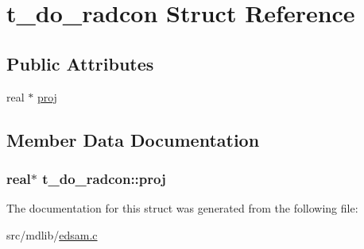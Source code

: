 \hypertarget{structt__do__radcon}{\section{t\-\_\-do\-\_\-radcon \-Struct \-Reference}
\label{structt__do__radcon}
}
\subsection*{\-Public \-Attributes}
\begin{DoxyCompactItemize}
\item 
real $\ast$ \hyperlink{structt__do__radcon_af11c41ccf9d5964e1b0f8993b23706ca}{proj}
\end{DoxyCompactItemize}


\subsection{\-Member \-Data \-Documentation}
\hypertarget{structt__do__radcon_af11c41ccf9d5964e1b0f8993b23706ca}{
\subsubsection[{proj}]{\setlength{\rightskip}{0pt plus 5cm}real$\ast$ {\bf t\-\_\-do\-\_\-radcon\-::proj}}}\label{structt__do__radcon_af11c41ccf9d5964e1b0f8993b23706ca}


\-The documentation for this struct was generated from the following file\-:\begin{DoxyCompactItemize}
\item 
src/mdlib/\hyperlink{edsam_8c}{edsam.\-c}\end{DoxyCompactItemize}
